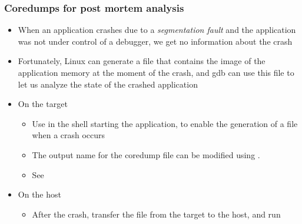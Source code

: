 \begin{frame}
  \frametitle{Coredumps for post mortem analysis}
  \begin{itemize}
  \item When an application crashes due to a {\em segmentation fault}
    and the application was not under control of a debugger, we get no
    information about the crash
  \item Fortunately, Linux can generate a  file that
    contains the image of the application memory at the moment of the
    crash, and gdb can use this  file to let us analyze the
    state of the crashed application
  \item On the target
    \begin{itemize}
    \item Use  in the shell starting the
      application, to enable the generation of a  file
      when a crash occurs
    \item The output name for the coredump file can be modified using
      .
    \item See 
    \end{itemize}
  \item On the host
    \begin{itemize}
    \item After the crash, transfer the  file from the target to
      the host, and run
    \end{itemize}
  \end{itemize}
\end{frame}
